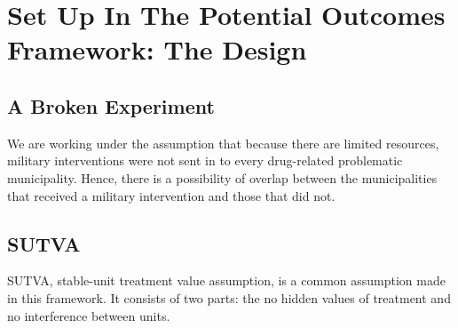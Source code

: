 \documentclass{article}[11 pt]
\begin{document}
\section{Set Up In The Potential Outcomes Framework: The Design}
\subsection{A Broken Experiment}We are working under the assumption that because there are limited resources, military interventions were not sent in to every drug-related problematic municipality. Hence, there is a possibility of overlap between the municipalities that received a military intervention and those that did not.

\subsection{SUTVA}		
		SUTVA, stable-unit treatment value assumption, is a common assumption made in this framework. It consists of two parts: the no hidden values of treatment and no interference between units.
\end{document}
